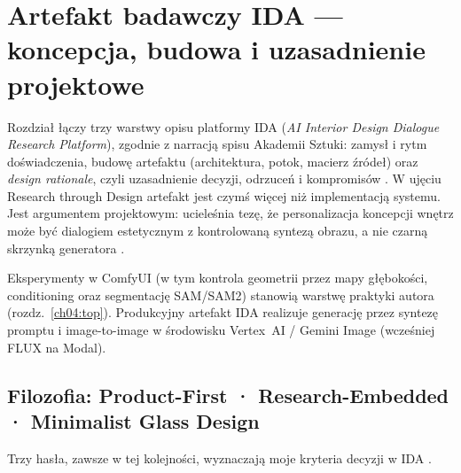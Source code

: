\chapter{Artefakt badawczy IDA --- koncepcja, budowa i uzasadnienie projektowe}
\label{ch07:top}

Rozdział łączy trzy warstwy opisu platformy IDA (\emph{AI Interior Design Dialogue Research Platform}), zgodnie z narracją spisu Akademii Sztuki: zamysł i rytm doświadczenia, budowę artefaktu (architektura, potok, macierz źródeł) oraz \emph{design rationale}, czyli uzasadnienie decyzji, odrzuceń i kompromisów \parencite{idaPlatform2026}.
W ujęciu Research through Design artefakt jest czymś więcej niż implementacją systemu. Jest argumentem projektowym: ucieleśnia tezę, że personalizacja koncepcji wnętrz może być dialogiem estetycznym z kontrolowaną syntezą obrazu, a nie czarną skrzynką generatora \parencite{zimmerman2007rtd,frayling1993research}.

Eksperymenty w ComfyUI (w tym kontrola geometrii przez mapy głębokości, conditioning oraz segmentację SAM/SAM2) stanowią warstwę praktyki autora (rozdz.~\ref{ch04:top}). Produkcyjny artefakt IDA realizuje generację przez syntezę promptu i image-to-image w środowisku Vertex~AI / Gemini Image (wcześniej FLUX na Modal).

\section{Filozofia: Product-First · Research-Embedded · Minimalist Glass Design}
\label{ch07:sec:filozofia}

Trzy hasła, zawsze w tej kolejności, wyznaczają moje kryteria decyzji w IDA \parencite{idaPlatform2026}.

